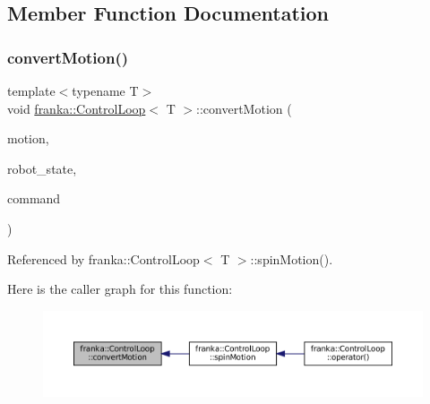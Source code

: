 \subsection{Member Function Documentation}
\mbox{\label{classfranka_1_1ControlLoop_a51052003f900ee3e99bc5409df6bbf47}} 
\subsubsection{\texorpdfstring{convert\+Motion()}{convertMotion()}\hspace{0.1cm}{\footnotesize\ttfamily [1/5]}}
{\footnotesize\ttfamily template$<$typename T$>$ \\
void \hyperlink{classfranka_1_1ControlLoop}{franka\+::\+Control\+Loop}$<$ T $>$\+::convert\+Motion (\begin{DoxyParamCaption}\item[{const T \&}]{motion,  }\item[{const \hyperlink{structfranka_1_1RobotState}{Robot\+State} \&}]{robot\+\_\+state,  }\item[{\hyperlink{structresearch__interface_1_1robot_1_1MotionGeneratorCommand}{research\+\_\+interface\+::robot\+::\+Motion\+Generator\+Command} $\ast$}]{command }\end{DoxyParamCaption})\hspace{0.3cm}{\ttfamily [private]}}



Referenced by franka\+::\+Control\+Loop$<$ T $>$\+::spin\+Motion().

Here is the caller graph for this function\+:
\nopagebreak
\begin{figure}[H]
\begin{center}
\leavevmode
\includegraphics[width=350pt]{classfranka_1_1ControlLoop_a51052003f900ee3e99bc5409df6bbf47_icgraph}
\end{center}
\end{figure}
\mbox{\label{classfranka_1_1ControlLoop_aab46712ac11588d598ff9d99958ba98d}} 
